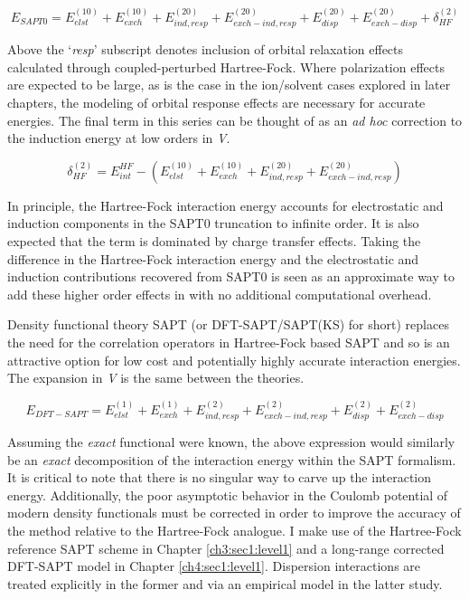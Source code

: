\begin{theory}
  \begin{equation}\label{sapt0}
      E_{SAPT0} = E_{elst}^{(10)} + E_{exch}^{(10)} + E_{ind,resp}^{(20)} + E_{exch-ind,resp}^{(20)} + 
      E_{disp}^{(20)} + E_{exch-disp}^{(20)} + \delta_{HF}^{(2)}
  \end{equation}
  
  Above the `\emph{resp}' subscript denotes inclusion of orbital relaxation effects calculated through 
  coupled-perturbed Hartree-Fock. Where polarization effects are expected to be large, as is the case in the 
  ion/solvent cases explored in later chapters, the modeling of orbital response effects are necessary for 
  accurate energies. The final term in this series can be thought of as an \emph{ad hoc} correction to the 
  induction energy at low orders in \emph{V}.
  
  \begin{equation}\label{deltahf}
      \delta_{HF}^{(2)} = E_{int}^{HF} - (E_{elst}^{(10)} + E_{exch}^{(10)} + E_{ind,resp}^{(20)} + 
      E_{exch-ind,resp}^{(20)})
  \end{equation}
  
  In principle, the Hartree-Fock interaction energy accounts for electrostatic and induction components in the
  SAPT0 truncation to infinite order. It is also expected that the term is dominated by charge transfer 
  effects\cite{lande2015cdftct}. Taking the difference in the Hartree-Fock interaction energy and the 
  electrostatic and induction contributions recovered from SAPT0 is seen as an approximate way to add these 
  higher order effects in with no additional computational overhead.
  
  Density functional theory SAPT (or DFT-SAPT/SAPT(KS) for short) replaces the need for the correlation 
  operators in Hartree-Fock based SAPT and so is an attractive option for low cost and potentially highly
  accurate interaction energies. The expansion in \emph{V} is the same between the theories.
  
  \begin{equation}\label{dftsapt}
      E_{DFT-SAPT} = E_{elst}^{(1)} + E_{exch}^{(1)} + E_{ind,resp}^{(2)} + E_{exch-ind,resp}^{(2)} + 
      E_{disp}^{(2)} + E_{exch-disp}^{(2)}
  \end{equation}
  
  Assuming the \emph{exact} functional were known, the above expression would similarly be an \emph{exact}
  decomposition of the interaction energy within the SAPT formalism. It is critical to note that there is no
  singular way to carve up the interaction energy. Additionally, the poor asymptotic behavior in the Coulomb
  potential of modern density functionals must be corrected in order to improve the accuracy of the method 
  relative to the Hartree-Fock analogue. I make use of the Hartree-Fock reference SAPT scheme in Chapter
  \ref{ch3:sec1:level1} and a long-range corrected DFT-SAPT model in Chapter \ref{ch4:sec1:level1}. Dispersion
  interactions are treated explicitly in the former and via an empirical 
  model\cite{herbert2011xsapt1,herbert2012xsapt2,lao2014xsaptksd3} in the latter study.
  

\end{theory}
